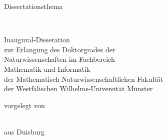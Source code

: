 
\begin{titlepage}

\begin{addmargin}[-1cm]{-3cm}
\begin{center}
\large

\hfill
\vfill

{\LARGE {}}

\vfill

Dissertationsthema

\vfill

\begingroup
  \Huge \color{\titleColor}\spacedallcaps{\myTitle} \\ \bigskip %
\endgroup

\vfill

\begin{center}
  \begin{minipage}[t]{.85\textwidth}
    \centering
    Inaugural-Disseration\\ zur Erlangung des Doktorgrades der\\
    Naturwissenschaften im Fachbereich\\ Mathematik und Informatik\\ der
    Mathematisch-Naturwissenschaftlichen Fakultät\\ der Westfälischen
    Wilhelms-Universität Münster
  \end{minipage}
\end{center}

\vfill

vorgelegt von

\bigskip \bigskip

\spacedlowsmallcaps{\myName} \\ \medskip
aus Duisburg

\bigskip \bigskip

\myTime

\vfill

\end{center}
\end{addmargin}

\end{titlepage}
